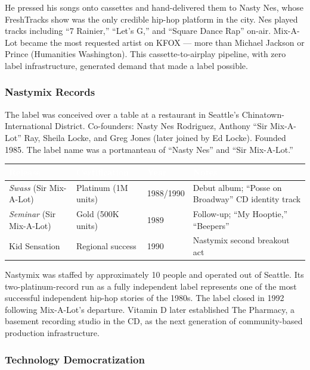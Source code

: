 \documentclass[11pt,letterpaper]{article}
\newcommand{\tableheader}[1]{\textbf{\sffamily\textcolor{white}{#1}}}
\begin{document}
He pressed his songs onto cassettes and hand-delivered them to Nasty Nes, whose FreshTracks show was the only credible hip-hop platform in the city. Nes played tracks including ``7 Rainier,'' ``Let's G,'' and ``Square Dance Rap'' on-air. Mix-A-Lot became the most requested artist on KFOX --- more than Michael Jackson or Prince (Humanities Washington). This cassette-to-airplay pipeline, with zero label infrastructure, generated demand that made a label possible.

\subsubsection{Nastymix Records}

The label was conceived over a table at a restaurant in Seattle's Chinatown-International District. Co-founders: Nasty Nes Rodriguez, Anthony ``Sir Mix-A-Lot'' Ray, Sheila Locke, and Greg Jones (later joined by Ed Locke). Founded 1985. The label name was a portmanteau of ``Nasty Nes'' and ``Sir Mix-A-Lot.''

\begin{center}
\begin{tabularx}{\textwidth}{L{2.5cm}L{2.5cm}L{2cm}X}
\toprule
{}
\tableheader{Release} & \tableheader{Certification} & \tableheader{Year} & \tableheader{Notes} \\
\midrule
\textit{Swass} (Sir Mix-A-Lot) & Platinum (1M units) & 1988/1990 & Debut album; ``Posse on Broadway'' CD identity track \\
\textit{Seminar} (Sir Mix-A-Lot) & Gold (500K units) & 1989 & Follow-up; ``My Hooptie,'' ``Beepers'' \\
Kid Sensation & Regional success & 1990 & Nastymix second breakout act \\
\bottomrule
\end{tabularx}
\end{center}

Nastymix was staffed by approximately 10 people and operated out of Seattle. Its two-platinum-record run as a fully independent label represents one of the most successful independent hip-hop stories of the 1980s. The label closed in 1992 following Mix-A-Lot's departure. Vitamin D later established The Pharmacy, a basement recording studio in the CD, as the next generation of community-based production infrastructure.

\subsubsection{Technology Democratization}
\end{document}
